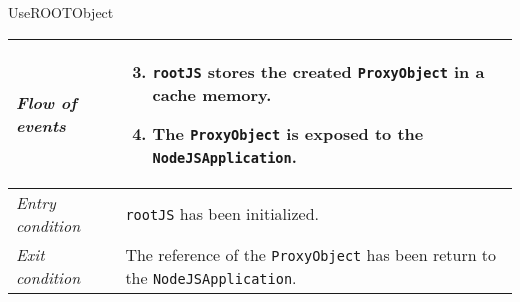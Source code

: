 \begin{frame}[t]{UseROOTObject}
        \begin{longtable}{p{3cm} @{\hskip 1cm} p{7cm}}
                \textit{Flow of events} &
                        \begin{enumerate}
                                \setcounter{enumi}{2}
                                \pause

                                \item \texttt{rootJS} stores the created \texttt{ProxyObject} in a cache memory.
                                \pause

                                \item The \texttt{ProxyObject} is exposed to the \texttt{NodeJSApplication}.
                        \end{enumerate}
                        \\
                \hline
                \pause

                \textit{Entry condition} & \texttt{rootJS} has been initialized.\\
                \hline

                \textit{Exit condition} & The reference of the \texttt{ProxyObject} has been return to the \texttt{NodeJSApplication}.\\
                \hline
        \end{longtable}
\end{frame}

